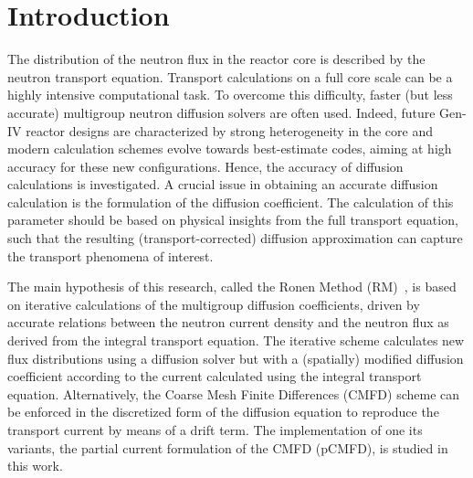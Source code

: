 %
%

\section{Introduction}
\label{sec:intro}

The distribution of the neutron flux in the reactor core is described by the neutron transport equation. Transport calculations on a full core scale can be a highly intensive computational task. To overcome this difficulty, faster (but less accurate) multigroup neutron diffusion solvers are often used. Indeed, future Gen-IV reactor designs are characterized by strong heterogeneity in the core and modern calculation schemes evolve towards best-estimate codes, aiming at high accuracy for these new configurations. Hence, the accuracy of diffusion calculations is investigated. A crucial issue in obtaining an accurate diffusion calculation is the formulation of the diffusion coefficient. The calculation of this parameter should be based on physical insights from the full transport equation, such that the resulting (transport-corrected) diffusion approximation can capture the transport phenomena of interest.

The main hypothesis of this research, called the Ronen Method (RM)~\cite{Ronen-2004,Tomatis-2011}, is based on iterative calculations of the multigroup diffusion coefficients, driven by accurate relations between the neutron current density and the neutron flux as derived from the integral transport equation. The iterative scheme calculates new flux distributions using a diffusion solver but with a (spatially) modified diffusion coefficient according to the current calculated using the integral transport equation. Alternatively, the Coarse Mesh Finite Differences (CMFD) scheme can be enforced in the discretized form of the diffusion equation to reproduce the transport current by means of a drift term. The implementation of one its variants, the partial current formulation of the CMFD (pCMFD), is studied in this work.
%

